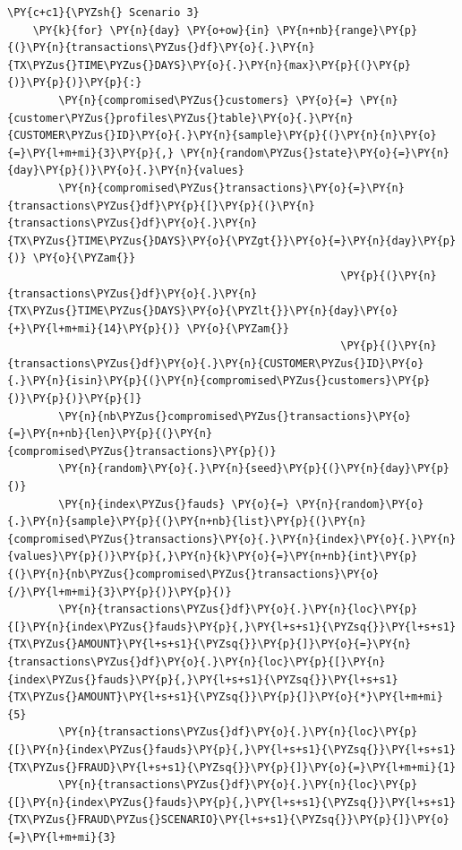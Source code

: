 \begin{tcolorbox}[breakable, size=fbox, boxrule=1pt, pad at break*=1mm,colback=cellbackground, colframe=cellborder]
\begin{Verbatim}[commandchars=\\\{\}]
    \PY{c+c1}{\PYZsh{} Scenario 3}
    \PY{k}{for} \PY{n}{day} \PY{o+ow}{in} \PY{n+nb}{range}\PY{p}{(}\PY{n}{transactions\PYZus{}df}\PY{o}{.}\PY{n}{TX\PYZus{}TIME\PYZus{}DAYS}\PY{o}{.}\PY{n}{max}\PY{p}{(}\PY{p}{)}\PY{p}{)}\PY{p}{:}
        \PY{n}{compromised\PYZus{}customers} \PY{o}{=} \PY{n}{customer\PYZus{}profiles\PYZus{}table}\PY{o}{.}\PY{n}{CUSTOMER\PYZus{}ID}\PY{o}{.}\PY{n}{sample}\PY{p}{(}\PY{n}{n}\PY{o}{=}\PY{l+m+mi}{3}\PY{p}{,} \PY{n}{random\PYZus{}state}\PY{o}{=}\PY{n}{day}\PY{p}{)}\PY{o}{.}\PY{n}{values}
        \PY{n}{compromised\PYZus{}transactions}\PY{o}{=}\PY{n}{transactions\PYZus{}df}\PY{p}{[}\PY{p}{(}\PY{n}{transactions\PYZus{}df}\PY{o}{.}\PY{n}{TX\PYZus{}TIME\PYZus{}DAYS}\PY{o}{\PYZgt{}}\PY{o}{=}\PY{n}{day}\PY{p}{)} \PY{o}{\PYZam{}}
                                                    \PY{p}{(}\PY{n}{transactions\PYZus{}df}\PY{o}{.}\PY{n}{TX\PYZus{}TIME\PYZus{}DAYS}\PY{o}{\PYZlt{}}\PY{n}{day}\PY{o}{+}\PY{l+m+mi}{14}\PY{p}{)} \PY{o}{\PYZam{}}
                                                    \PY{p}{(}\PY{n}{transactions\PYZus{}df}\PY{o}{.}\PY{n}{CUSTOMER\PYZus{}ID}\PY{o}{.}\PY{n}{isin}\PY{p}{(}\PY{n}{compromised\PYZus{}customers}\PY{p}{)}\PY{p}{)}\PY{p}{]}
        \PY{n}{nb\PYZus{}compromised\PYZus{}transactions}\PY{o}{=}\PY{n+nb}{len}\PY{p}{(}\PY{n}{compromised\PYZus{}transactions}\PY{p}{)}
        \PY{n}{random}\PY{o}{.}\PY{n}{seed}\PY{p}{(}\PY{n}{day}\PY{p}{)}
        \PY{n}{index\PYZus{}fauds} \PY{o}{=} \PY{n}{random}\PY{o}{.}\PY{n}{sample}\PY{p}{(}\PY{n+nb}{list}\PY{p}{(}\PY{n}{compromised\PYZus{}transactions}\PY{o}{.}\PY{n}{index}\PY{o}{.}\PY{n}{values}\PY{p}{)}\PY{p}{,}\PY{n}{k}\PY{o}{=}\PY{n+nb}{int}\PY{p}{(}\PY{n}{nb\PYZus{}compromised\PYZus{}transactions}\PY{o}{/}\PY{l+m+mi}{3}\PY{p}{)}\PY{p}{)}
        \PY{n}{transactions\PYZus{}df}\PY{o}{.}\PY{n}{loc}\PY{p}{[}\PY{n}{index\PYZus{}fauds}\PY{p}{,}\PY{l+s+s1}{\PYZsq{}}\PY{l+s+s1}{TX\PYZus{}AMOUNT}\PY{l+s+s1}{\PYZsq{}}\PY{p}{]}\PY{o}{=}\PY{n}{transactions\PYZus{}df}\PY{o}{.}\PY{n}{loc}\PY{p}{[}\PY{n}{index\PYZus{}fauds}\PY{p}{,}\PY{l+s+s1}{\PYZsq{}}\PY{l+s+s1}{TX\PYZus{}AMOUNT}\PY{l+s+s1}{\PYZsq{}}\PY{p}{]}\PY{o}{*}\PY{l+m+mi}{5}
        \PY{n}{transactions\PYZus{}df}\PY{o}{.}\PY{n}{loc}\PY{p}{[}\PY{n}{index\PYZus{}fauds}\PY{p}{,}\PY{l+s+s1}{\PYZsq{}}\PY{l+s+s1}{TX\PYZus{}FRAUD}\PY{l+s+s1}{\PYZsq{}}\PY{p}{]}\PY{o}{=}\PY{l+m+mi}{1}
        \PY{n}{transactions\PYZus{}df}\PY{o}{.}\PY{n}{loc}\PY{p}{[}\PY{n}{index\PYZus{}fauds}\PY{p}{,}\PY{l+s+s1}{\PYZsq{}}\PY{l+s+s1}{TX\PYZus{}FRAUD\PYZus{}SCENARIO}\PY{l+s+s1}{\PYZsq{}}\PY{p}{]}\PY{o}{=}\PY{l+m+mi}{3}


\end{Verbatim}
\end{tcolorbox}
